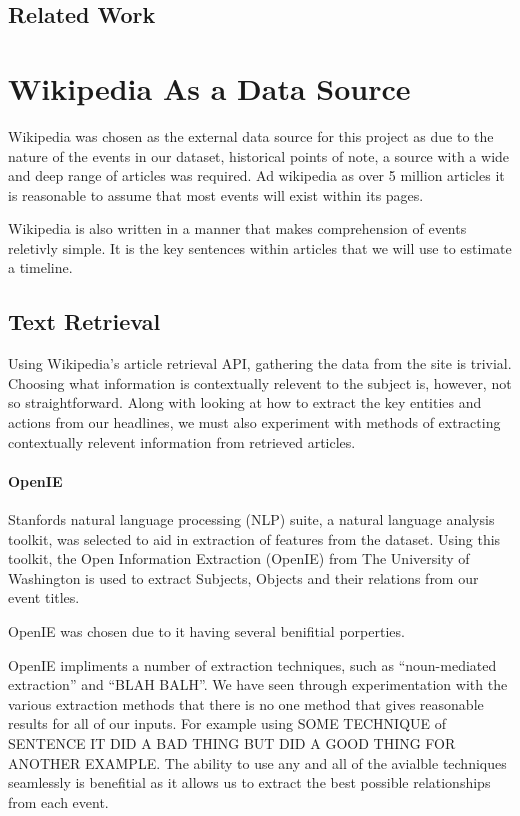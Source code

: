 \documentclass[bsc,frontabs,twoside,singlespacing,parskip,deptreport]{infthesis}     %
\begin{document}
\section{Related Work}


\chapter{Wikipedia As a Data Source}%
Wikipedia was chosen as the external data source for this project as
due to the nature of the events in our dataset, historical points of note,
a source with a wide and deep range of articles was required.
Ad wikipedia as over 5 million articles \cite{} it is reasonable to assume
that most events will exist within its pages.

Wikipedia is also written in a manner that makes comprehension of events reletivly simple.
It is the key sentences within articles that we will use to estimate a timeline.

\section{Text Retrieval}
Using Wikipedia's article retrieval API, gathering the data from
the site is trivial.
Choosing what information is contextually relevent to the subject is, however, not so straightforward.
Along with looking at how to extract the key entities and actions from our 
headlines, we must also experiment with methods of extracting contextually relevent information from
retrieved articles.

\subsubsection{OpenIE}
Stanfords natural language processing (NLP) suite,
a natural language analysis toolkit,
was selected to aid in extraction of features from the dataset.
Using this toolkit, the Open Information Extraction (OpenIE) from
The University of Washington is used to extract Subjects, Objects
and their relations from our event titles.

OpenIE was chosen due to it having several benifitial porperties.

OpenIE impliments a number of extraction techniques, such as ``noun-mediated extraction'' and ``BLAH BALH''.
We have seen through experimentation with the various
extraction methods that there is no one method that gives reasonable results for all of our inputs.
For example using SOME TECHNIQUE of SENTENCE IT DID A BAD THING BUT DID A GOOD THING FOR ANOTHER EXAMPLE.
The ability to use any and all of the avialble techniques seamlessly is benefitial as it allows us to
extract the best possible relationships from each event. 
\end{document}
